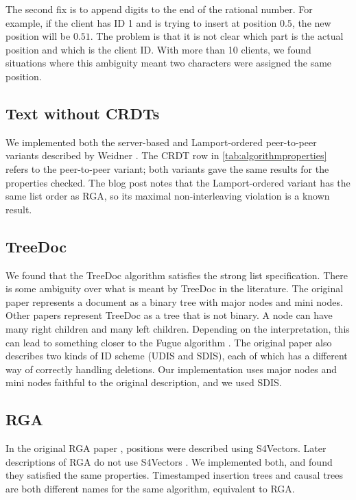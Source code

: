 \documentclass[sigplan,10pt,review,anonymous]{acmart}
\begin{document}
The second fix is to append digits to the end of the rational number. For example, if the client has ID 1 and is trying to insert at position $0.5$, the new position will be $0.51$. The problem is that it is not clear which part is the actual position and which is the client ID. With more than 10 clients, we found situations where this ambiguity meant two characters were assigned the same position.

\subsection{Text without CRDTs}

We implemented both the server-based and Lamport-ordered peer-to-peer variants described by Weidner \cite{Weidner2025without}. The CRDT row in \autoref{tab:algorithmproperties} refers to the peer-to-peer variant; both variants gave the same results for the properties checked. The blog post notes that the Lamport-ordered variant has the same list order as RGA, so its maximal non-interleaving violation is a known result.

\subsection{TreeDoc}

We found that the TreeDoc \cite{Preguica2009} algorithm satisfies the strong list specification. There is some ambiguity over what is meant by TreeDoc in the literature. The original paper
represents a document as a binary tree with major nodes and mini nodes. Other papers \cite{Zawirski2011} represent TreeDoc as a tree that is not binary. A node can have many right
children and many left children. Depending on the interpretation, this can lead to something closer to the Fugue algorithm \cite{Weidner2025Fugue}. The original paper also 
describes two kinds of ID scheme (UDIS and SDIS), each of which has a different way of correctly handling deletions. Our implementation uses major nodes and mini nodes faithful to the original description, and we used SDIS.

\subsection{RGA}

In the original RGA paper \cite{Roh2009}, positions were described using S4Vectors. Later descriptions of RGA do not use S4Vectors \cite{Shapiro2011report}. We implemented both, and found they satisfied the same properties. Timestamped insertion trees \cite{Attiya2016} and causal trees \cite{Grishchenko2010} are both different names for the same algorithm, equivalent to RGA. 
\end{document}
